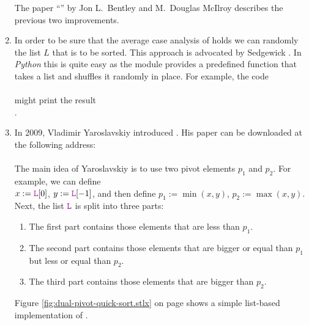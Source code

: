 \begin{enumerate}
      The paper ``'' by Jon L.~Bentley and M.~Douglas McIlroy
      \cite{bentley:93} describes the previous two improvements.
\item In order to be sure that the average case analysis of  holds we can randomly
       the list $L$ that is to be sorted.  This approach is advocated by Sedgewick
      \cite{sedgewick:2011}.  In \textsl{Python} this is quite easy as
      the module  provides a predefined function  that takes a list and shuffles
      it randomly in place.  For example, the code
      \\[0.2cm]
      \hspace*{1.3cm}
      \\[0.2cm]
      might print the result
      \\[0.2cm]
      \hspace*{1.3cm}
      \mytt{[1, 9, 8, 5, 2, 0, 6, 3, 4, 7]}.
\item In 2009, Vladimir Yaroslavskiy introduced 
      \cite{yaroslavskiy:2009}.
      His paper can be
      downloaded at the following address:
      \\[0.2cm]
      \hspace*{1.3cm}
      \href{http://codeblab.com/wp-content/uploads/2009/09/DualPivotQuicksort.pdf}{}
      \\[0.2cm]
      The main idea of Yaroslavskiy is to use two pivot elements $p_1$ and $p_2$.  For example, we can
      define
      \\[0.2cm]
      \hspace*{1.3cm}
      $x := \mytt{L}[0]$, $y := \mytt{L}[-1]$, \quad and then define \quad $p_1 :=\min(x, y)$, $p_2 := \max(x, y)$.
      \\[0.2cm]
      Next, the list $\mytt{L}$ is split into three parts:
      \begin{enumerate}
      \item The first part contains those elements that are less than $p_1$.
      \item The second part contains those elements that are bigger or equal than $p_1$ but less or
            equal than $p_2$.
      \item The third part contains those elements that are bigger than $p_2$.
      \end{enumerate}
      Figure \ref{fig:dual-pivot-quick-sort.stlx} on page \pageref{fig:dual-pivot-quick-sort.stlx}
      shows a simple list-based implementation of .


\end{enumerate}
